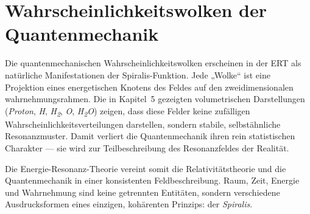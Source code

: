 \section{Wahrscheinlichkeitswolken der Quantenmechanik}
Die quantenmechanischen Wahrscheinlichkeitswolken erscheinen in der \acrshort{ERT} als natürliche Manifestationen der Spiralis-Funktion.  
Jede „Wolke“ ist eine Projektion eines energetischen Knotens des Feldes auf den zweidimensionalen \gls{wahrnehmungsrahmen}.  
Die in Kapitel~5 gezeigten volumetrischen Darstellungen (\textit{Proton}, \textit{H}, \textit{H\textsubscript{2}}, \textit{O}, \textit{H\textsubscript{2}O}) zeigen, dass diese Felder keine zufälligen Wahrscheinlichkeitsverteilungen darstellen, sondern stabile, selbstähnliche Resonanzmuster.  
Damit verliert die Quantenmechanik ihren rein statistischen Charakter — sie wird zur Teilbeschreibung des Resonanzfeldes der Realität.  

\vspace{1em}
\noindent
Die Energie-Resonanz-Theorie vereint somit die Relativitätstheorie und die Quantenmechanik in einer konsistenten Feldbeschreibung. 
Raum, Zeit, Energie und Wahrnehmung sind keine getrennten Entitäten, sondern verschiedene Ausdrucksformen eines einzigen, kohärenten Prinzips: der \textit{Spiralis}.
